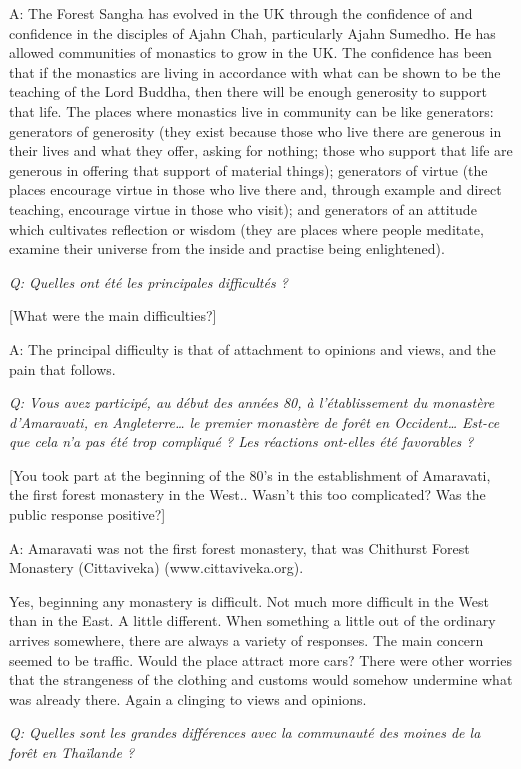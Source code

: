 A: The Forest Sangha has evolved in the UK through the confidence of and
confidence in the disciples of Ajahn Chah, particularly Ajahn Sumedho.
He has allowed communities of monastics to grow in the UK. The
confidence has been that if the monastics are living in accordance with
what can be shown to be the teaching of the Lord Buddha, then there will
be enough generosity to support that life. The places where monastics
live in community can be like generators: generators of generosity (they
exist because those who live there are generous in their lives and what
they offer, asking for nothing; those who support that life are generous
in offering that support of material things); generators of virtue (the
places encourage virtue in those who live there and, through example and
direct teaching, encourage virtue in those who visit); and generators of
an attitude which cultivates reflection or wisdom (they are places where
people meditate, examine their universe from the inside and practise
being enlightened).

\emph{Q: Quelles ont été les principales difficultés ?}

{[}What were the main difficulties?{]}

A: The principal difficulty is that of attachment to opinions and views,
and the pain that follows.

\emph{Q: Vous avez participé, au début des années 80, à l'établissement
du monastère d'Amaravati, en Angleterre\ldots{} le premier monastère de
forêt en Occident\ldots{} Est-ce que cela n'a pas été trop compliqué ?
Les réactions ont-elles été favorables ?}

{[}You took part at the beginning of the 80's in the establishment of
Amaravati, the first forest monastery in the West.. Wasn't this too
complicated? Was the public response positive?{]}

A: Amaravati was not the first forest monastery, that was Chithurst
Forest Monastery (Cittaviveka) (www.cittaviveka.org).

Yes, beginning any monastery is difficult. Not much more difficult in
the West than in the East. A little different. When something a little
out of the ordinary arrives somewhere, there are always a variety of
responses. The main concern seemed to be traffic. Would the place
attract more cars? There were other worries that the strangeness of the
clothing and customs would somehow undermine what was already there.
Again a clinging to views and opinions.

\emph{Q: Quelles sont les grandes différences avec la communauté des
moines de la forêt en Thaïlande ?}


